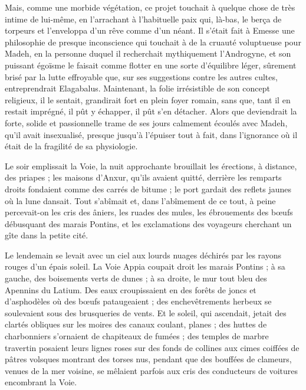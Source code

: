 \documentclass[a4paper, 11pt, oneside, polutonikogreek, french]{article}
\begin{document}
Mais, comme une morbide végétation, ce projet touchait à quelque chose de très intime de lui-même, en l'arrachant à l'habituelle paix qui, là-bas, le berça de torpeurs et l'enveloppa d'un rêve comme d'un néant. Il s'était fait à Emesse une philosophie de presque inconscience qui touchait à de la cruauté voluptueuse pour Madeh, en la personne duquel il recherchait mythiquement l’Androgyne, et son puissant égoïsme le faisait comme flotter en une sorte d'équilibre léger, sûrement brisé par la lutte effroyable que, sur ses suggestions contre les autres cultes, entreprendrait Elagabalus. Maintenant, la folie irrésistible de son concept religieux, il le sentait, grandirait fort en plein foyer romain, sans que, tant il en restait imprégné, il pût y échapper, il pût s'en détacher. Alors que deviendrait la forte, solide et passionnelle trame de ses jours calmement écoulés avec Madeh, qu'il avait insexualisé, presque jusqu'à l'épuiser tout à fait, dans l'ignorance où il était de la fragilité de sa physiologie.

Le soir emplissait la Voie, la nuit approchante brouillait les érections, à distance, des priapes ; les maisons d'Anxur, qu'ils avaient quitté, derrière les remparts droits fondaient comme des carrés de bitume ; le port gardait des reflets jaunes où la lune dansait. Tout s'abîmait et, dans l'abîmement de ce tout, à peine percevait-on les cris des âniers, les ruades des mules, les ébrouements des bœufs débusquant des marais Pontins, et les exclamations des voyageurs cherchant un gîte dans la petite cité.

Le lendemain se levait avec un ciel aux lourds nuages déchirés par les rayons rouges d'un épais soleil. La Voie Appia coupait droit les marais Pontins ; à sa gauche, des boisements verts de dunes ; à sa droite, le mur tout bleu des Apennins du Latium. Des eaux croupissaient en des forêts de joncs et d'asphodèles où des bœufs pataugeaient ; des enchevêtrements herbeux se soulevaient sous des brusqueries de vents. Et le soleil, qui ascendait, jetait des clartés obliques sur les moires des canaux coulant, planes ; des huttes de charbonniers s'ornaient de chapiteaux de fumées ; des temples de marbre travertin posaient leurs lignes roses sur des fonds de collines aux cimes coiffées de pâtres volsques montrant des torses nus, pendant que des bouffées de clameurs, venues de la mer voisine, se mêlaient parfois aux cris des conducteurs de voitures encombrant la Voie.
\end{document}
